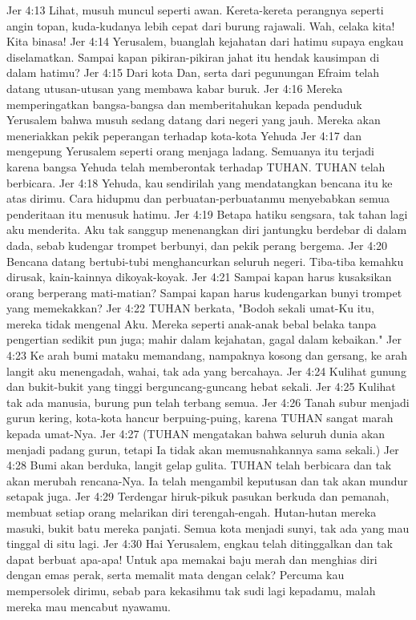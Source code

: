 Jer 4:13  Lihat, musuh muncul seperti awan. Kereta-kereta perangnya seperti angin topan, kuda-kudanya lebih cepat dari burung rajawali. Wah, celaka kita! Kita binasa!
Jer 4:14  Yerusalem, buanglah kejahatan dari hatimu supaya engkau diselamatkan. Sampai kapan pikiran-pikiran jahat itu hendak kausimpan di dalam hatimu?
Jer 4:15  Dari kota Dan, serta dari pegunungan Efraim telah datang utusan-utusan yang membawa kabar buruk.
Jer 4:16  Mereka memperingatkan bangsa-bangsa dan memberitahukan kepada penduduk Yerusalem bahwa musuh sedang datang dari negeri yang jauh. Mereka akan meneriakkan pekik peperangan terhadap kota-kota Yehuda
Jer 4:17  dan mengepung Yerusalem seperti orang menjaga ladang. Semuanya itu terjadi karena bangsa Yehuda telah memberontak terhadap TUHAN. TUHAN telah berbicara.
Jer 4:18  Yehuda, kau sendirilah yang mendatangkan bencana itu ke atas dirimu. Cara hidupmu dan perbuatan-perbuatanmu menyebabkan semua penderitaan itu menusuk hatimu.
Jer 4:19  Betapa hatiku sengsara, tak tahan lagi aku menderita. Aku tak sanggup menenangkan diri jantungku berdebar di dalam dada, sebab kudengar trompet berbunyi, dan pekik perang bergema.
Jer 4:20  Bencana datang bertubi-tubi menghancurkan seluruh negeri. Tiba-tiba kemahku dirusak, kain-kainnya dikoyak-koyak.
Jer 4:21  Sampai kapan harus kusaksikan orang berperang mati-matian? Sampai kapan harus kudengarkan bunyi trompet yang memekakkan?
Jer 4:22  TUHAN berkata, "Bodoh sekali umat-Ku itu, mereka tidak mengenal Aku. Mereka seperti anak-anak bebal belaka tanpa pengertian sedikit pun juga; mahir dalam kejahatan, gagal dalam kebaikan."
Jer 4:23  Ke arah bumi mataku memandang, nampaknya kosong dan gersang, ke arah langit aku menengadah, wahai, tak ada yang bercahaya.
Jer 4:24  Kulihat gunung dan bukit-bukit yang tinggi berguncang-guncang hebat sekali.
Jer 4:25  Kulihat tak ada manusia, burung pun telah terbang semua.
Jer 4:26  Tanah subur menjadi gurun kering, kota-kota hancur berpuing-puing, karena TUHAN sangat marah kepada umat-Nya.
Jer 4:27  (TUHAN mengatakan bahwa seluruh dunia akan menjadi padang gurun, tetapi Ia tidak akan memusnahkannya sama sekali.)
Jer 4:28  Bumi akan berduka, langit gelap gulita. TUHAN telah berbicara dan tak akan merubah rencana-Nya. Ia telah mengambil keputusan dan tak akan mundur setapak juga.
Jer 4:29  Terdengar hiruk-pikuk pasukan berkuda dan pemanah, membuat setiap orang melarikan diri terengah-engah. Hutan-hutan mereka masuki, bukit batu mereka panjati. Semua kota menjadi sunyi, tak ada yang mau tinggal di situ lagi.
Jer 4:30  Hai Yerusalem, engkau telah ditinggalkan dan tak dapat berbuat apa-apa! Untuk apa memakai baju merah dan menghias diri dengan emas perak, serta memalit mata dengan celak? Percuma kau mempersolek dirimu, sebab para kekasihmu tak sudi lagi kepadamu, malah mereka mau mencabut nyawamu.
